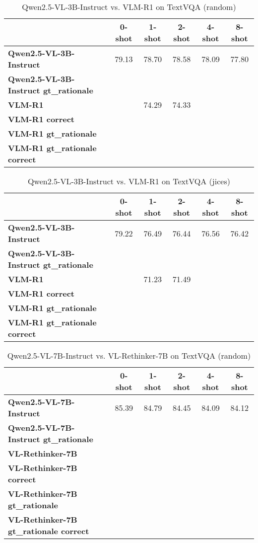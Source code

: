 \begin{table}
\caption{Qwen2.5-VL-3B-Instruct vs. VLM-R1 on TextVQA (random)}
\label{tab:Qwen2.5-VL-3B-Instruct_TextVQA_TRAIN_random}
\begin{tabular}{lccccc}
\toprule
 & 0-shot & 1-shot & 2-shot & 4-shot & 8-shot \\
\midrule
\textbf{Qwen2.5-VL-3B-Instruct} & 79.13 & 78.70 & 78.58 & 78.09 & 77.80 \\
\textbf{Qwen2.5-VL-3B-Instruct gt\_rationale} &  &  &  &  &  \\
\textbf{VLM-R1} &  & 74.29 & 74.33 &  &  \\
\textbf{VLM-R1 correct} &  &  &  &  &  \\
\textbf{VLM-R1 gt\_rationale} &  &  &  &  &  \\
\textbf{VLM-R1 gt\_rationale correct} &  &  &  &  &  \\
\bottomrule
\end{tabular}
\end{table}


\begin{table}
\caption{Qwen2.5-VL-3B-Instruct vs. VLM-R1 on TextVQA (jices)}
\label{tab:Qwen2.5-VL-3B-Instruct_TextVQA_TRAIN_jices}
\begin{tabular}{lccccc}
\toprule
 & 0-shot & 1-shot & 2-shot & 4-shot & 8-shot \\
\midrule
\textbf{Qwen2.5-VL-3B-Instruct} & 79.22 & 76.49 & 76.44 & 76.56 & 76.42 \\
\textbf{Qwen2.5-VL-3B-Instruct gt\_rationale} &  &  &  &  &  \\
\textbf{VLM-R1} &  & 71.23 & 71.49 &  &  \\
\textbf{VLM-R1 correct} &  &  &  &  &  \\
\textbf{VLM-R1 gt\_rationale} &  &  &  &  &  \\
\textbf{VLM-R1 gt\_rationale correct} &  &  &  &  &  \\
\bottomrule
\end{tabular}
\end{table}


\begin{table}
\caption{Qwen2.5-VL-7B-Instruct vs. VL-Rethinker-7B on TextVQA (random)}
\label{tab:Qwen2.5-VL-7B-Instruct_TextVQA_TRAIN_random}
\begin{tabular}{lccccc}
\toprule
 & 0-shot & 1-shot & 2-shot & 4-shot & 8-shot \\
\midrule
\textbf{Qwen2.5-VL-7B-Instruct} & 85.39 & 84.79 & 84.45 & 84.09 & 84.12 \\
\textbf{Qwen2.5-VL-7B-Instruct gt\_rationale} &  &  &  &  &  \\
\textbf{VL-Rethinker-7B} &  &  &  &  &  \\
\textbf{VL-Rethinker-7B correct} &  &  &  &  &  \\
\textbf{VL-Rethinker-7B gt\_rationale} &  &  &  &  &  \\
\textbf{VL-Rethinker-7B gt\_rationale correct} &  &  &  &  &  \\
\bottomrule
\end{tabular}
\end{table}



